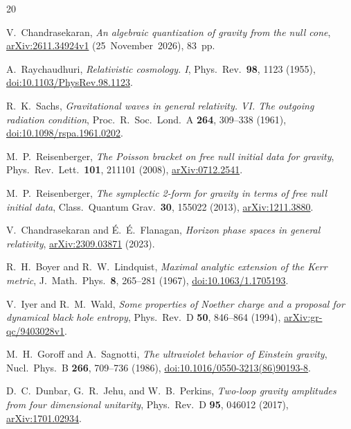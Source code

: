 \documentclass[10pt,a4paper]{article}
\numberwithin{equation}{section}
\begin{document}
\begingroup
\small
\raggedright
\begin{thebibliography}{20}\setlength{\itemsep}{2pt plus 1pt}

V.~Chandrasekaran,
\emph{An algebraic quantization of gravity from the null cone},
\href{https://arxiv.org/abs/2611.34924v1}{arXiv:2611.34924v1} (25~November~2026), 83~pp.

A.~Raychaudhuri,
\emph{Relativistic cosmology. I},
Phys.\ Rev.\ \textbf{98}, 1123 (1955),
\href{https://doi.org/10.1103/PhysRev.98.1123}{doi:10.1103/PhysRev.98.1123}.

R.~K.~Sachs,
\emph{Gravitational waves in general relativity. VI. The outgoing radiation condition},
Proc.\ R.\ Soc.\ Lond.\ A \textbf{264}, 309--338 (1961),
\href{https://doi.org/10.1098/rspa.1961.0202}{doi:10.1098/rspa.1961.0202}.

M.~P.~Reisenberger,
\emph{The Poisson bracket on free null initial data for gravity},
Phys.\ Rev.\ Lett.\ \textbf{101}, 211101 (2008),
\href{https://arxiv.org/abs/0712.2541}{arXiv:0712.2541}.

M.~P.~Reisenberger,
\emph{The symplectic 2-form for gravity in terms of free null initial data},
Class.\ Quantum Grav.\ \textbf{30}, 155022 (2013),
\href{https://arxiv.org/abs/1211.3880}{arXiv:1211.3880}.

V.~Chandrasekaran and \'E.~\'E.~Flanagan,
\emph{Horizon phase spaces in general relativity},
\href{https://arxiv.org/abs/2309.03871}{arXiv:2309.03871} (2023).

R.~H.~Boyer and R.~W.~Lindquist,
\emph{Maximal analytic extension of the Kerr metric},
J.\ Math.\ Phys.\ \textbf{8}, 265--281 (1967),
\href{https://doi.org/10.1063/1.1705193}{doi:10.1063/1.1705193}.

V.~Iyer and R.~M.~Wald,
\emph{Some properties of Noether charge and a proposal for dynamical black hole entropy},
Phys.\ Rev.\ D \textbf{50}, 846--864 (1994),
\href{https://arxiv.org/abs/gr-qc/9403028v1}{arXiv:gr-qc/9403028v1}.

M.~H.~Goroff and A.~Sagnotti,
\emph{The ultraviolet behavior of Einstein gravity},
Nucl.\ Phys.\ B \textbf{266}, 709--736 (1986),
\href{https://doi.org/10.1016/0550-3213(86)90193-8}{doi:10.1016/0550-3213(86)90193-8}.

D.~C.~Dunbar, G.~R.~Jehu, and W.~B.~Perkins,
\emph{Two-loop gravity amplitudes from four dimensional unitarity},
Phys.\ Rev.\ D \textbf{95}, 046012 (2017),
\href{https://arxiv.org/abs/1701.02934}{arXiv:1701.02934}.


\end{thebibliography}
\end{document}
